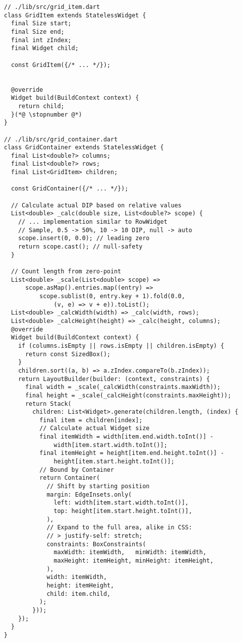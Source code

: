 \begin{lstlisting}
// ./lib/src/grid_item.dart
class GridItem extends StatelessWidget {
  final Size start;
  final Size end;
  final int zIndex;
  final Widget child;

  const GridItem({/* ... */});


  @override
  Widget build(BuildContext context) {
    return child;
  }(*@ \stopnumber @*)
}

// ./lib/src/grid_container.dart
class GridContainer extends StatelessWidget {
  final List<double?> columns;
  final List<double?> rows;
  final List<GridItem> children;

  const GridContainer({/* ... */});

  // Calculate actual DIP based on relative values
  List<double> _calc(double size, List<double?> scope) {
    // ... implementation similar to RowWidget
    // Sample, 0.5 -> 50%, 10 -> 10 DIP, null -> auto
    scope.insert(0, 0.0); // leading zero
    return scope.cast(); // null-safety
  }

  // Count length from zero-point
  List<double> _scale(List<double> scope) =>
      scope.asMap().entries.map((entry) => 
          scope.sublist(0, entry.key + 1).fold(0.0, 
              (v, e) => v + e)).toList();
  List<double> _calcWidth(width) => _calc(width, rows);
  List<double> _calcHeight(height) => _calc(height, columns);
  @override
  Widget build(BuildContext context) {
    if (columns.isEmpty || rows.isEmpty || children.isEmpty) {
      return const SizedBox();
    }
    children.sort((a, b) => a.zIndex.compareTo(b.zIndex));
    return LayoutBuilder(builder: (context, constraints) {
      final width = _scale(_calcWidth(constraints.maxWidth));
      final height = _scale(_calcHeight(constraints.maxHeight));
      return Stack(
        children: List<Widget>.generate(children.length, (index) {
          final item = children[index];
          // Calculate actual Widget size
          final itemWidth = width[item.end.width.toInt()] - 
              width[item.start.width.toInt()];
          final itemHeight = height[item.end.height.toInt()] - 
              height[item.start.height.toInt()];
          // Bound by Container
          return Container(
            // Shift by starting position
            margin: EdgeInsets.only(
              left: width[item.start.width.toInt()],
              top: height[item.start.height.toInt()],
            ),
            // Expand to the full area, alike in CSS:
            // > justify-self: stretch;
            constraints: BoxConstraints(
              maxWidth: itemWidth,   minWidth: itemWidth,
              maxHeight: itemHeight, minHeight: itemHeight,
            ),
            width: itemWidth,
            height: itemHeight,
            child: item.child,
          );
        }));
    });
  }
}
\end{lstlisting}

